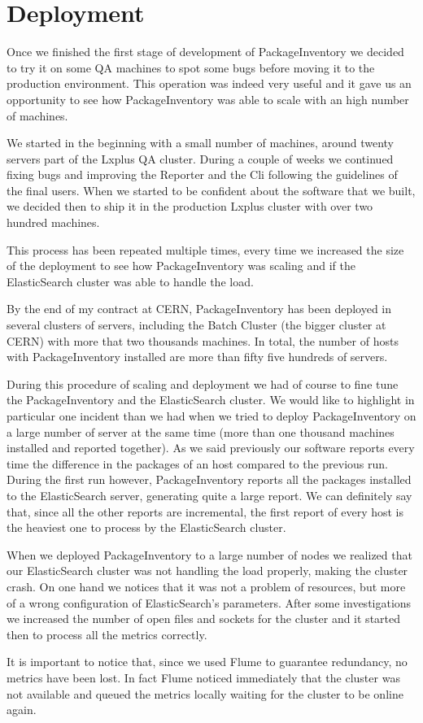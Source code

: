\section{Deployment}

Once we finished the first stage of development of PackageInventory we
decided to try it on some QA machines to spot some bugs before moving it
to the production environment. This operation was indeed very useful and
it gave us an opportunity to see how PackageInventory was able to scale
with an high number of machines.

We started in the beginning with a small number of machines, around twenty
servers part of the Lxplus QA cluster. During a couple of weeks we
continued fixing bugs and improving the Reporter and the Cli following the
guidelines of the final users. When we started to be confident about the
software that we built, we decided then to ship it in the production
Lxplus cluster with over two hundred machines.

This process has been repeated multiple times, every time we increased the
size of the deployment to see how PackageInventory was scaling and if the
ElasticSearch cluster was able to handle the load.

By the end of my contract at CERN, PackageInventory has been deployed in
several clusters of servers, including the Batch Cluster (the bigger
cluster at CERN) with more that two thousands machines. In total, the
number of hosts with PackageInventory installed are more than fifty five
hundreds of servers.

During this procedure of scaling and deployment we had of course to fine
tune the PackageInventory and the ElasticSearch cluster. We would like to
highlight in particular one incident than we had when we tried to deploy
PackageInventory on a large number of server at the same time (more than
one thousand machines installed and reported together). As we said
previously our software reports every time the difference in the packages
of an host compared to the previous run. During the first run however,
PackageInventory reports all the packages installed to the ElasticSearch
server, generating quite a large report. We can definitely say that, since
all the other reports are incremental, the first report of every host is
the heaviest one to process by the ElasticSearch cluster.

When we deployed PackageInventory to a large number of nodes we realized
that our ElasticSearch cluster was not handling the load properly, making
the cluster crash. On one hand we notices that it was not a problem of
resources, but more of a wrong configuration of ElasticSearch's
parameters. After some investigations we increased the number of open
files and sockets for the cluster and it started then to process all the
metrics correctly.

It is important to notice that, since we used Flume to guarantee
redundancy, no metrics have been lost. In fact Flume noticed immediately
that the cluster was not available and queued the metrics locally waiting
for the cluster to be online again.

